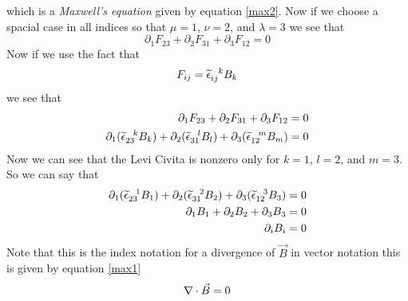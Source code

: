 \documentclass[11pt]{article}
\numberwithin{equation}{section}
\begin{document}
\begin{enumerate}[(a)]
which is a \emph{Maxwell's equation} given by equation \ref{max2}. Now if we choose a spacial case in all indices so that $\mu=1$, $\nu=2$, and $\lambda=3$ we see that
$$\partial_{1}F_{23} + \partial_{2}F_{31} + \partial_{3}F_{12} =0 $$
Now if we use the fact that 
$$F_{ij} = \widetilde{\epsilon}_{ij}^{\ \ k}B_k$$
we see that 
\begin{align*}
\partial_{1}F_{23} + \partial_{2}F_{31} + \partial_{3}F_{12} &= 0 \\
\partial_{1}(\levi_{23}^{\ \ k}B_k) + \partial_{2}(\levi_{31}^{\ \ l}B_l) + \partial_{3}(\levi_{12}^{\ \ m}B_m) &= 0 
\end{align*}
Now we can see that the Levi Civita is nonzero only for $k=1$, $l=2$, and $m=3$. So we can say that
\begin{align*}
\partial_{1}(\levi_{23}^{\ \ 1}B_1) + \partial_{2}(\levi_{31}^{\ \ 2}B_2) + \partial_{3}(\levi_{12}^{\ \ 3}B_3) &= 0 \\
\partial_{1}B_1 + \partial_{2}B_2 + \partial_{3}B_3 &= 0 \\
\partial_{i}B_i  &= 0 
\end{align*}
Note that this is the index notation for a divergence of $\vec{B}$ in vector notation this is given by equation \ref{max1}
$$\bold\nabla\cdot\vec{B}= 0$$
\end{enumerate}
\end{document}
